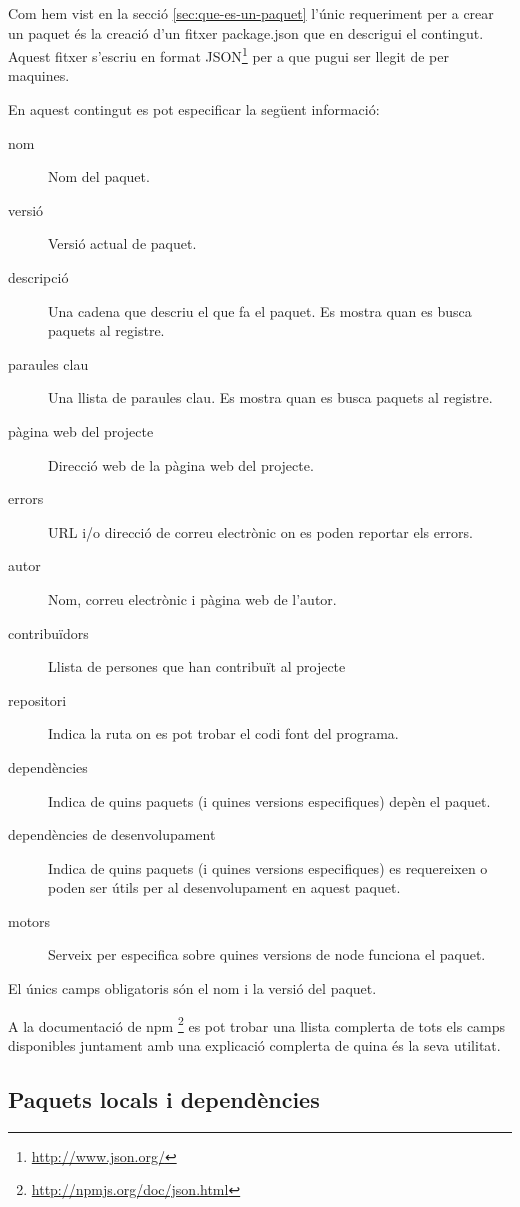 Com hem vist en la secció \ref{sec:que-es-un-paquet} l'únic requeriment per a crear un paquet és la creació d'un fitxer package.json que en descrigui el contingut. Aquest fitxer s'escriu en format JSON\footnote{\url{http://www.json.org/}} per a que pugui ser llegit de per maquines. 

En aquest contingut es pot especificar la següent informació: 
\begin{description}
\item[nom] {Nom del paquet.}
\item[versió] {Versió actual de paquet.}
\item[descripció] {Una cadena que descriu el que fa el paquet. Es mostra quan es busca paquets al registre.}
\item[paraules clau] {Una llista de paraules clau. Es mostra quan es busca paquets al registre.}
\item[pàgina web del projecte] {Direcció web de la pàgina web del projecte.}
\item[errors] { URL i/o direcció de correu electrònic on es poden reportar els errors. }
\item[autor] {Nom, correu electrònic i pàgina web de l'autor.}
\item[contribuïdors] { Llista de persones que han contribuït al projecte}
\item[repositori] { Indica la ruta on es pot trobar el codi font del programa. }
\item[dependències] { Indica de quins paquets (i quines versions especifiques) depèn el paquet.}
\item[dependències de desenvolupament] { Indica de quins paquets (i quines versions especifiques) es requereixen o poden ser útils per al desenvolupament en aquest paquet.}
\item[motors] {Serveix per especifica sobre quines versions de node funciona el paquet.}

\end{description}

El únics camps obligatoris són el nom i la versió del paquet. 

A la documentació de npm \footnote{\url{http://npmjs.org/doc/json.html}} es pot trobar una llista complerta de tots els camps disponibles juntament amb una explicació complerta de quina és la seva utilitat. 

\subsection{Paquets locals i dependències}

